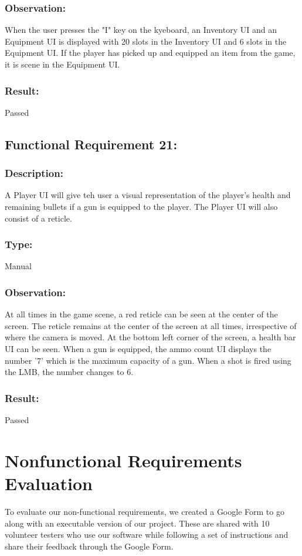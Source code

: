 \documentclass[12pt, titlepage]{article}
\begin{document}
\subsubsection{Observation: } When the user presses the "I" key on the kyeboard, an Inventory UI and an Equipment UI is displayed with 20 slots in the Inventory UI and 6 slots in the Equipment UI. If the player has picked up and equipped an item from the game, it is scene in the Equipment UI.

\subsubsection[Pass / Fail:] {Result: } Passed


\subsection{Functional Requirement 21: } 

\subsubsection{Description: }A Player UI will give teh user a visual representation of the player's health and remaining bullets if a gun is equipped to the player. The Player UI will also consist of a reticle.
\subsubsection{Type: } Manual

\subsubsection{Observation: } At all times in the game scene, a red reticle can be seen at the center of the screen. The reticle remains at the center of the screen at all times, irrespective of where the camera is moved. At the bottom left corner of the screen, a health bar UI can be seen. When a gun is equipped, the ammo count UI displays the number '7' which is the maximum capacity of a gun. When a shot is fired using the LMB, the number changes to 6.

\subsubsection[Pass / Fail:] {Result: } Passed

\section{Nonfunctional Requirements Evaluation}
 To evaluate our non-functional requirements, we created a Google Form to go along with an executable version of our project. These are shared with 10 volunteer testers who use our software while following a set of instructions and share their feedback through the Google Form.
 
\end{document}
